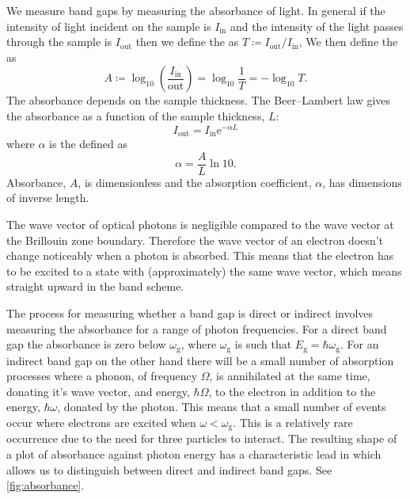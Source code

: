 \documentclass[fleqn]{NotesClass}
\newcommand*{\e}{\mathrm{e}}
\begin{document}
    We measure band gaps by measuring the absorbance of light.
    In general if the intensity of light incident on the sample is \(I_{\mathrm{in}}\) and the intensity of the light passes through the sample is \(I_{\mathrm{out}}\) then we define the  as \(T \coloneqq I_{\mathrm{out}} / I_{\mathrm{in}}\),
    We then define the  as
    \begin{equation}
        A \coloneqq \log_{10}\left( \frac{I_{\mathrm{in}}}{\mathrm{out}} \right) = \log_{10}\frac{1}{T} = -\log_{10}T.
    \end{equation}
    The absorbance depends on the sample thickness.
    The Beer--Lambert law gives the absorbance as a function of the sample thickness, \(L\):
    \begin{equation}
        I_{\mathrm{out}} = I_{\mathrm{in}} \e^{-\alpha L}
    \end{equation}
    where \(\alpha\) is the  defined as
    \begin{equation}
        \alpha = \frac{A}{L}\ln 10.
    \end{equation}
    Absorbance, \(A\), is dimensionless and the absorption coefficient, \(\alpha\), has dimensions of inverse length.
    
    The wave vector of optical photons is negligible compared to the wave vector at the Brillouin zone boundary.
    Therefore the wave vector of an electron doesn't change noticeably when a photon is absorbed.
    This means that the electron has to be excited to a state with (approximately) the same wave vector, which means straight upward in the band scheme.
    
    The process for measuring whether a band gap is direct or indirect involves measuring the absorbance for a range of photon frequencies.
    For a direct band gap the absorbance is zero below \(\omega_{\mathrm{g}}\), where \(\omega_{\mathrm{g}}\) is such that \(E_{\mathrm{g}} = \hbar\omega_{\mathrm{g}}\).
    For an indirect band gap on the other hand there will be a small number of absorption processes where a phonon, of frequency \(\Omega\), is annihilated at the same time, donating it's wave vector, and energy, \(\hbar\Omega\), to the electron in addition to the energy, \(\hbar\omega\), donated by the photon.
    This means that a small number of events occur where electrons are excited when \(\omega < \omega_{\mathrm{g}}\).
    This is a relatively rare occurrence due to the need for three particles to interact.
    The resulting shape of a plot of absorbance against photon energy has a characteristic lead in which allows us to distinguish between direct and indirect band gaps.
    See \cref{fig:absorbance}.
    
\end{document}
